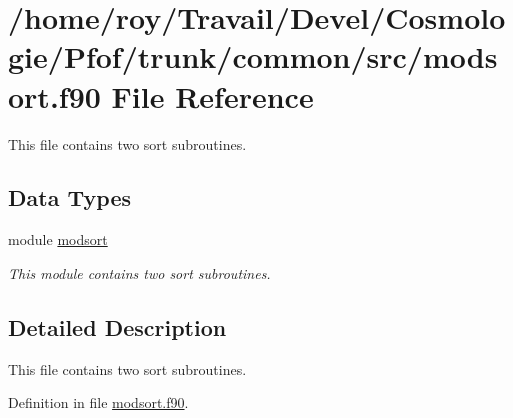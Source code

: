\hypertarget{modsort_8f90}{\section{/home/roy/\-Travail/\-Devel/\-Cosmologie/\-Pfof/trunk/common/src/modsort.f90 File Reference}
\label{modsort_8f90}
}


This file contains two sort subroutines.  


\subsection*{Data Types}
\begin{DoxyCompactItemize}
\item 
module \hyperlink{classmodsort}{modsort}
\begin{DoxyCompactList}\small\item\em This module contains two sort subroutines. \end{DoxyCompactList}\end{DoxyCompactItemize}


\subsection{Detailed Description}
This file contains two sort subroutines. 

Definition in file \hyperlink{modsort_8f90_source}{modsort.\-f90}.

